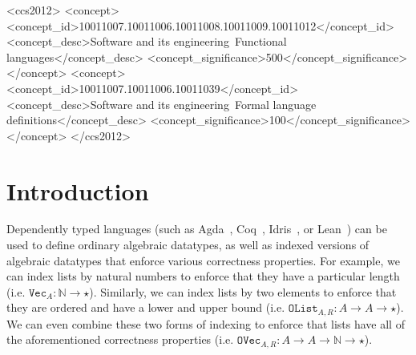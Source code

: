 \documentclass[acmsmall,screen]{acmart}
\newcommand{\txt}[1]{\ensuremath{\texttt{#1}}}
\newcommand{\arr}[0]{\ensuremath{\rightarrow}}
\newcommand{\nat}[0]{\ensuremath{\mathbb{N}}}
\begin{document}
\begin{CCSXML}
<ccs2012>
<concept>
<concept_id>10011007.10011006.10011008.10011009.10011012</concept_id>
<concept_desc>Software and its engineering~Functional languages</concept_desc>
<concept_significance>500</concept_significance>
</concept>
<concept>
<concept_id>10011007.10011006.10011039</concept_id>
<concept_desc>Software and its engineering~Formal language definitions</concept_desc>
<concept_significance>100</concept_significance>
</concept>
</ccs2012>
\end{CCSXML}





\maketitle

\section{Introduction}

Dependently typed languages
(such as Agda~\cite{lang:agda}, Coq~\cite{lang:coq},
Idris~\cite{lang:idris}, or Lean~\cite{lang:lean}) can be used to
define ordinary algebraic datatypes, as well as indexed versions of
algebraic datatypes that enforce various correctness properties.
For example, we can index lists by natural numbers to
enforce that they have a particular length
(i.e. \texttt{$\txt{Vec}_A : \nat \arr \star $}).
Similarly, we can index lists by two elements to
enforce that they are ordered and have a lower and upper bound
(i.e. \texttt{$\txt{OList}_{A,R} : A \arr A \arr \star $}).
We can even combine these two forms of indexing to
enforce that lists have all of the aforementioned correctness properties
(i.e. \texttt{$\txt{OVec}_{A,R} : A \arr A \arr \nat \arr \star$}).
\end{document}
